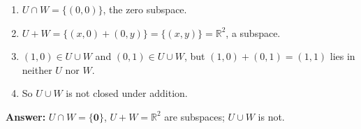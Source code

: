\documentclass[11pt]{article}
\begin{document}
\begin{tcolorbox}[breakable,colback=ans,colframe=ansb,boxrule=0.5pt,left=4pt,right=4pt,top=2pt,bottom=2pt]\begin{enumerate}[leftmargin=2.2em,itemsep=1pt,topsep=1pt,label=\textbf{Step \arabic*.}]\item $U\cap W=\{(0,0)\}$, the zero subspace.
\item $U+W=\{(x,0)+(0,y)\}=\{(x,y)\}=\mathbb{R}^{2}$, a subspace.
\item $(1,0)\in U\cup W$ and $(0,1)\in U\cup W$, but $(1,0)+(0,1)=(1,1)$ lies in neither $U$ nor $W$.
\item So $U\cup W$ is not closed under addition.
\end{enumerate}\textbf{Answer:} $U\cap W=\{\mathbf 0\}$, $U+W=\mathbb{R}^{2}$ are subspaces; $U\cup W$ is not.\end{tcolorbox}
\par\vspace{2pt}
\end{document}
